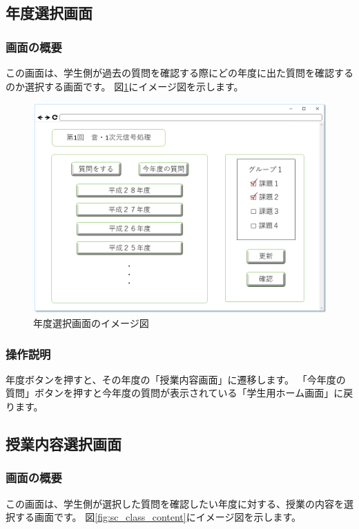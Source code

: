\newpage

\subsection{年度選択画面}
\subsubsection{画面の概要}
この画面は、学生側が過去の質問を確認する際にどの年度に出た質問を確認するのか選択する画面です。
図\ref{fig:sc_select_year}にイメージ図を示します。

\begin{figure}[htbp]
\begin{center}
  \includegraphics[width=1\linewidth,clip]{./img/sc_select_year.png}
  \caption{年度選択画面のイメージ図}\label{fig:sc_select_year}
\end{center}
\end{figure}

\subsubsection{操作説明}
年度ボタンを押すと、その年度の「授業内容画面」に遷移します。
「今年度の質問」ボタンを押すと今年度の質問が表示されている「学生用ホーム画面」に戻ります。

\newpage

\subsection{授業内容選択画面}
\subsubsection{画面の概要}
この画面は、学生側が選択した質問を確認したい年度に対する、授業の内容を選択する画面です。
図\ref{fig:sc_class_content}にイメージ図を示します。

